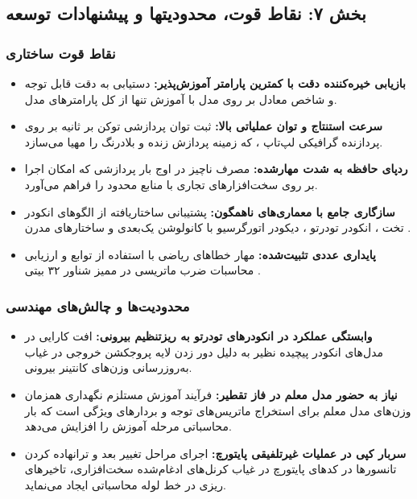 \subsection*{بخش ۷: نقاط قوت، محدودیتها و پیشنهادات توسعه }

\subsubsection*{نقاط قوت ساختاری }
\begin{itemize}
    \item \textbf{بازیابی خیره‌کننده دقت با کمترین پارامتر آموزش‌پذیر:} دستیابی به دقت قابل توجه  و شاخص  معادل  بر روی مدل  با آموزش تنها  از کل پارامترهای مدل.
    \item \textbf{سرعت استنتاج و توان عملیاتی بالا:} ثبت توان پردازشی  توکن بر ثانیه بر روی پردازنده گرافیکی لپ‌تاپ ، که زمینه پردازش زنده و بلادرنگ را مهیا می‌سازد.
    \item \textbf{ردپای حافظه به شدت مهارشده:} مصرف ناچیز  در اوج بار پردازشی که امکان اجرا بر روی سخت‌افزارهای تجاری با منابع محدود را فراهم می‌آورد.
    \item \textbf{سازگاری جامع با معماری‌های ناهمگون:} پشتیبانی ساختاریافته از الگوهای انکودر تخت ، انکودر تودرتو ، دیکودر اتورگرسیو با کانولوشن یک‌بعدی  و ساختارهای مدرن  .
    \item \textbf{پایداری عددی تثبیت‌شده:} مهار خطاهای ریاضی با استفاده از توابع  و ارزیابی محاسبات ضرب ماتریسی در ممیز شناور ۳۲ بیتی .
\end{itemize}

\subsubsection*{محدودیت‌ها و چالش‌های مهندسی }
\begin{itemize}
    \item \textbf{وابستگی عملکرد در انکودرهای تودرتو به ریزتنظیم بیرونی:} افت کارایی در مدل‌های انکودر پیچیده نظیر  به دلیل دور زدن لایه پروجکشن خروجی در غیاب به‌روزرسانی وزن‌های کانتینر بیرونی.
    \item \textbf{نیاز به حضور مدل معلم در فاز تقطیر:} فرآیند آموزش مستلزم نگهداری همزمان وزن‌های مدل معلم برای استخراج ماتریس‌های توجه و بردارهای ویژگی است که بار محاسباتی مرحله آموزش را افزایش می‌دهد.
    \item \textbf{سربار کپی در عملیات غیرتلفیقی پایتورچ:} اجرای مراحل تغییر بعد و ترانهاده کردن تانسورها در کدهای پایتورچ در غیاب کرنل‌های ادغام‌شده سخت‌افزاری، تاخیرهای ریزی در خط لوله محاسباتی ایجاد می‌نماید.
\end{itemize}


